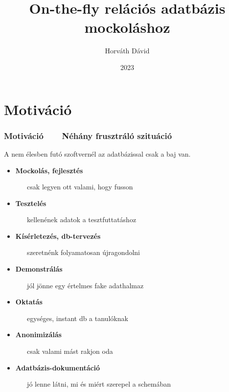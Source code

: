 \documentclass{beamer}
\title{On-the-fly relációs adatbázis mockoláshoz}
\author{Horváth Dávid}
\institute{ELTE Informatikai Kar}
\date{2023}
\newcommand{\condpause}{\pause}
\newcommand{\slidetitle}[2]{\frametitle{{\small #1 ~ \ding{226} ~ } #2}}
\begin{document}
\beamertemplatenavigationsymbolsempty

\frame{\titlepage}


\def\sectiontitle{Motiváció}
\section{\sectiontitle}

\def\motintro{A nem élesben futó szoftvernél az adatbázissal csak a baj van.}
\newif\ifmotfirst
\newcommand{\motcommcont}{
	\item \textbf{Mockolás, fejlesztés} \par ~ ~ csak legyen ott valami, hogy fusson \ifmotfirst \condpause \fi
	\item \textbf{Tesztelés} \par ~ ~ kellenének adatok a tesztfuttatáshoz \ifmotfirst \condpause \fi
	\item \textbf{Kísérletezés, db-tervezés} \par ~ ~ szeretnénk folyamatosan újragondolni \ifmotfirst \condpause \fi
	\item \textbf{Demonstrálás} \par ~ ~ jól jönne egy értelmes fake adathalmaz \ifmotfirst \condpause \fi
	\item \textbf{Oktatás} \par ~ ~ egységes, instant db a tanulóknak \ifmotfirst \condpause \fi
	\item \textbf{Anonimizálás} \par ~ ~ csak valami mást rakjon oda \ifmotfirst \condpause \fi
}
\newcommand{\motaftercont}{
	\item \textbf{Adatbázis-dokumentáció} \par ~ ~ jó lenne látni, mi és miért szerepel a schemában
}


\begin{frame}
\slidetitle{\sectiontitle}{Néhány frusztráló szituáció}

\motintro \smallskip \condpause

\motfirsttrue
\begin{itemize}
	\motcommcont
	\smallskip
	\motaftercont
\end{itemize}

\end{frame}
\end{document}
